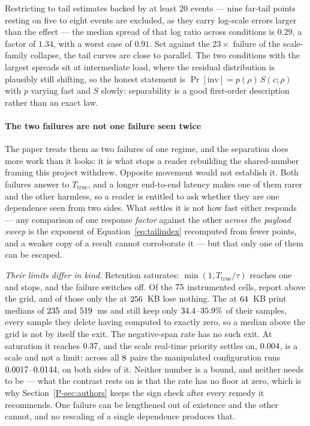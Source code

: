 \documentclass[10pt,journal,onecolumn]{IEEEtran}
\newcommand{\mainAuthors}{\ref{P-sec:authors}}        %
\begin{document}
Restricting to tail estimates backed by at least $20$ events --- nine far-tail points resting on
five to eight events are excluded, as they carry log-scale errors larger than the effect --- the
median spread of that log ratio across conditions is $\mathbf{0.29}$, a factor of $1.34$, with a
worst case of $0.91$. Set against the $23\times$ failure of the scale-family collapse, the tail
curves are close to parallel. The two conditions with the largest spreads sit at intermediate
load, where the residual distribution is plausibly still shifting, so the honest statement is
$\Pr[\text{inv}] = p(\rho)\,S(c;\rho)$ with $p$ varying fast and $S$ slowly: separability is a
good first-order description rather than an exact law.

\paragraph{The two failures are not one failure seen twice}
The paper treats them as two failures of one regime, and the separation does more work than
it looks: it is what stops a reader rebuilding the shared-number framing this project
withdrew. Opposite movement would not establish it.
Both failures answer to $T_{\mathrm{true}}$, and a longer end-to-end latency makes one of
them rarer and the other harmless, so a reader is entitled to ask whether they are one
dependence seen from two sides. What settles it is not how fast either responds --- any
comparison of one response \emph{factor} against the other \emph{across the payload sweep}
is the exponent of Equation~\ref{eq:tailindex} recomputed from fewer points, and a weaker
copy of a result cannot corroborate it --- but that only one of them can be escaped.

\emph{Their limits differ in kind.} Retention saturates: $\min(1, T_{\mathrm{true}}/
\tau)$ reaches one and stops, and the failure switches off. Of the
$75$ instrumented cells, \ombEscapeCellsWord{} report above the grid, and of
those only the \ombAboveGridWholeWord{} at $256$~KB lose nothing. The
\ombAboveGridPartialWord{} at $64$~KB print medians of
$235$ and $519$~ms and still keep only
$34.4$--$35.9\%$ of their samples, every sample
they delete having computed to exactly zero, so a median above the grid is not by itself
the exit. The negative-span rate has no such exit. At saturation it reaches
$0.37$, and the scale real-time priority settles on, $0.004$, is a scale and
not a limit: across all $8$ pairs the manipulated configuration runs
$0.0017$--$0.0144$, on both sides of it. Neither number is a bound, and
neither needs to be --- what the contrast rests on is that the rate has no floor at zero,
which is why Section~\mainAuthors{} keeps the sign check after every
remedy it recommends. One failure can be lengthened out of existence and the other
cannot, and no rescaling of a single dependence produces that.
\end{document}
